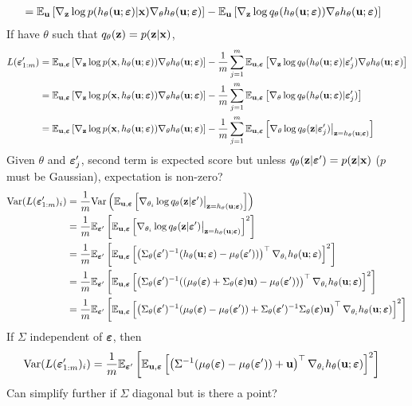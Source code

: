 \documentclass[10pt]{article}
\begin{document}
\begin{itemize}
\begin{align*}
&= \mathbb{E}_{\mathbf{u}}\left[\nabla_{\mathbf{z}}\log p(h_\theta(\mathbf{u};\bm{\varepsilon})|\mathbf{x})\nabla_\theta h_\theta(\mathbf{u};\bm{\varepsilon})\right] - \mathbb{E}_{\mathbf{u}}\left[\nabla_{\mathbf{z}}\log q_\theta(h_\theta(\mathbf{u};\bm{\varepsilon})) \nabla_\theta h_\theta(\mathbf{u};\bm{\varepsilon})\right]
\end{align*}
If have $\theta$ such that $q_\theta(\mathbf{z})=p(\mathbf{z}|\mathbf{x})$,
\begin{align*}
L(\bm{\varepsilon}_{1:m}') &= \mathbb{E}_{\mathbf{u},\bm{\varepsilon}}\left[\nabla_{\mathbf{z}}\log p(\mathbf{x},h_\theta(\mathbf{u};\bm{\varepsilon}))\nabla_\theta h_\theta(\mathbf{u};\bm{\varepsilon})\right] - \frac{1}{m}\sum_{j=1}^m\mathbb{E}_{\mathbf{u},\bm{\varepsilon}}\left[\nabla_{\mathbf{z}}\log q_\theta(h_\theta(\mathbf{u};\bm{\varepsilon})|\bm{\varepsilon}_j') \nabla_\theta h_\theta(\mathbf{u};\bm{\varepsilon})\right] \\
&= \mathbb{E}_{\mathbf{u},\bm{\varepsilon}}\left[\nabla_{\mathbf{z}}\log p(\mathbf{x},h_\theta(\mathbf{u};\bm{\varepsilon}))\nabla_\theta h_\theta(\mathbf{u};\bm{\varepsilon})\right] - \frac{1}{m}\sum_{j=1}^m\mathbb{E}_{\mathbf{u},\bm{\varepsilon}}\left[\nabla_\theta\log q_\theta(h_\theta(\mathbf{u};\bm{\varepsilon})|\bm{\varepsilon}_j')\right] \\
&= \mathbb{E}_{\mathbf{u},\bm{\varepsilon}}\left[\nabla_{\mathbf{z}}\log p(\mathbf{x},h_\theta(\mathbf{u};\bm{\varepsilon}))\nabla_\theta h_\theta(\mathbf{u};\bm{\varepsilon})\right] - \frac{1}{m}\sum_{j=1}^m\mathbb{E}_{\mathbf{u},\bm{\varepsilon}}\left[\nabla_\theta\log q_\theta(\mathbf{z}|\bm{\varepsilon}_j')\big|_{\mathbf{z}=h_\theta(\mathbf{u};\bm{\varepsilon})}\right]
\end{align*}
Given $\theta$ and $\bm{\varepsilon}_j'$, second term is expected score but unless $q_\theta(\mathbf{z}|\bm{\varepsilon}')=p(\mathbf{z}|\mathbf{x})$ ($p$ must be Gaussian), expectation is non-zero?
\begin{align*}
\mathrm{Var}(L(\bm{\varepsilon}_{1:m}')_i) &= \frac{1}{m}\mathrm{Var}\left(\mathbb{E}_{\mathbf{u},\bm{\varepsilon}}\left[\nabla_{\theta_i}\log q_\theta(\mathbf{z}|\bm{\varepsilon}')\big|_{\mathbf{z}=h_\theta(\mathbf{u};\bm{\varepsilon})}\right]\right) \\
&= \frac{1}{m}\mathbb{E}_{\bm{\varepsilon}'}\left[\mathbb{E}_{\mathbf{u},\bm{\varepsilon}}\left[\nabla_{\theta_i}\log q_\theta(\mathbf{z}|\bm{\varepsilon}')\big|_{\mathbf{z}=h_\theta(\mathbf{u};\bm{\varepsilon})}\right]^2\right] \\
&= \frac{1}{m}\mathbb{E}_{\bm{\varepsilon}'}\left[\mathbb{E}_{\mathbf{u},\bm{\varepsilon}}\left[\left(\Sigma_\theta(\bm{\varepsilon}')^{-1}(h_\theta(\mathbf{u};\bm{\varepsilon})-\mu_\theta(\bm{\varepsilon}'))\right)^\top\nabla_{\theta_i} h_\theta(\mathbf{u};\bm{\varepsilon})\right]^2\right] \\
&= \frac{1}{m}\mathbb{E}_{\bm{\varepsilon}'}\left[\mathbb{E}_{\mathbf{u},\bm{\varepsilon}}\left[\left(\Sigma_\theta(\bm{\varepsilon}')^{-1}(\left(\mu_\theta(\bm{\varepsilon})+\Sigma_\theta(\bm{\varepsilon})\mathbf{u}\right)-\mu_\theta(\bm{\varepsilon}'))\right)^\top\nabla_{\theta_i} h_\theta(\mathbf{u};\bm{\varepsilon})\right]^2\right] \\
&= \frac{1}{m}\mathbb{E}_{\bm{\varepsilon}'}\left[\mathbb{E}_{\mathbf{u},\bm{\varepsilon}}\left[\left(\Sigma_\theta(\bm{\varepsilon}')^{-1}(\mu_\theta(\bm{\varepsilon})-\mu_\theta(\bm{\varepsilon}'))+\Sigma_\theta(\bm{\varepsilon}')^{-1}\Sigma_\theta(\bm{\varepsilon})\mathbf{u}\right)^\top\nabla_{\theta_i} h_\theta(\mathbf{u};\bm{\varepsilon})\right]^2\right]
\end{align*}
If $\Sigma$ independent of $\bm{\varepsilon}$, then
\begin{align*}
\mathrm{Var}(L(\bm{\varepsilon}_{1:m}')_i) &= \frac{1}{m}\mathbb{E}_{\bm{\varepsilon}'}\left[\mathbb{E}_{\mathbf{u},\bm{\varepsilon}}\left[\left(\Sigma^{-1}(\mu_\theta(\bm{\varepsilon})-\mu_\theta(\bm{\varepsilon}'))+\mathbf{u}\right)^\top\nabla_{\theta_i} h_\theta(\mathbf{u};\bm{\varepsilon})\right]^2\right]
\end{align*}
Can simplify further if $\Sigma$ diagonal but is there a point?


\end{itemize}
\end{document}
